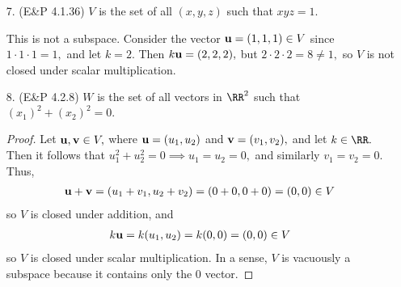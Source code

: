 \documentclass{article}
\newcommand{\vu}{{\bf u}}
\newcommand{\vv}{{\bf v}}
\begin{document}
\begin{itemize}
	\item[7.] (E\&P 4.1.36) $V$ is the set of all $(x, y, z)$ such that $xyz=1.$
		\begin{soln}
			This is not a subspace. Consider the vector $\vu =(1, 1, 1)\in V$ since $1\cdot 1\cdot 1 = 1,$ and let $k=2.$ Then $k\vu = (2, 2, 2),$ but $2\cdot2\cdot 2=8\neq 1,$ so $V$ is not closed under scalar multiplication.
		\end{soln}

	\item[8.] (E\&P 4.2.8) $W$ is the set of all vectors in $\RR^2$ such that $(x_1)^2+(x_2)^2=0.$
		\begin{proof}
			Let $\vu, \vv\in V,$ where $\vu=(u_1, u_2)$ and $\vv=(v_1, v_2),$ and let $k\in\RR.$ Then it follows that $u_1^2+u_2^2=0\implies u_1=u_2=0,$ and similarly $v_1=v_2=0.$ Thus,
			\begin{align*}
				\vu+\vv = (u_1+v_1, u_2+v_2) = (0+0, 0+0) = (0, 0)\in V
			\end{align*}
			so $V$ is closed under addition, and
			\begin{align*}
				k\vu = k(u_1, u_2) = k(0, 0) = (0, 0)\in V
			\end{align*}
			so $V$ is closed under scalar multiplication. In a sense, $V$ is vacuously a subspace because it contains only the 0 vector.
		\end{proof}

\end{itemize}
\end{document}
